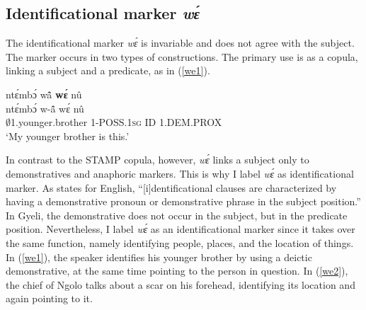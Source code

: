











\subsection{Identificational marker {\itshape wɛ́}}
\label{sec:ID}

The identificational marker {\itshape wɛ́} is invariable and does not agree with the subject. The marker occurs in two types of constructions. The primary use is as a copula, linking a subject and a predicate, as in (\ref{we1}). 

\begin{exe}
\ex\label{we1}
  \glll ntɛ́mbɔ́ wã̂ {\bfseries wɛ́} nû \\
        ntɛ́mbɔ́ w-ã̂ wɛ́ nû  \\
          $\emptyset$1.younger.brother 1-POSS.1\textsc{sg} ID 1.DEM.PROX  \\
    \trans `My younger brother is this.'
\end{exe}

In contrast to the STAMP copula, however, {\itshape wɛ́} links a subject only to demonstratives and anaphoric markers. This is why I label {\itshape wɛ́} as identificational marker.
As \citet[1812]{mikkelsen2011} states for English, ``[i]dentificational clauses are characterized by having a demonstrative pronoun or demonstrative phrase in the subject position.'' In Gyeli, the demonstrative does not occur in the subject, but in the predicate position. Nevertheless, I label {\itshape wɛ́} as an identificational marker since it takes over the same function, namely identifying people, places, and the location of things. In (\ref{we1}), the speaker identifies his younger brother by using a deictic demonstrative, at the same time pointing to the person in question. In (\ref{we2}), the chief of Ngolo talks about a scar on his forehead, identifying its location and again pointing to it.


